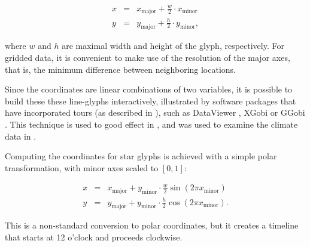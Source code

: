 \documentclass[oneside]{article}
\newcommand\amin{\text{minor}}
\newcommand\amaj{\text{major}}
\begin{document}
\begin{equation}
  \begin{array}{lll}
  x &=& x_{\amaj} + \frac{w}{2} \cdot x_{\amin}\\
  y &=& y_{\amaj} + \frac{h}{2} \cdot y_{\amin}, 
  \end{array}
  \label{coords.eqn}
\end{equation}

\noindent where $w$ and $h$ are maximal width and height of the glyph, respectively. For gridded data, it is convenient to make use of the resolution of the major axes, that is, the minimum difference between neighboring locations. 

Since the coordinates are linear combinations of two variables, it is possible to build these these line-glyphs interactively, illustrated by software packages that have incorporated tours (as described in \citet{cook:2006}), such as DataViewer \citep{buja:1986}, XGobi \citep{swayne:1991} or GGobi \citep{swayne:2003}. This technique is used to good effect in \citet{buja:1996a}, and was used to examine the climate data in \citet{hobbs:2010}.

Computing the coordinates for star glyphs is achieved with a simple polar transformation, with minor axes scaled to $[0, 1]$: 

\begin{equation}
  \begin{array}{lll}
  x &=& x_{\amaj} + y_{\amin} \cdot \frac{w}{2} \sin(2 \pi x_{\amin}) \\
  y &=& y_{\amaj} + y_{\amin} \cdot \frac{h}{2} \cos(2 \pi x_{\amin}).
  \end{array}
  \label{coords.polar.eqn}
\end{equation}

\noindent This is a non-standard conversion to polar coordinates, but it creates a timeline that starts at 12 o'clock and proceeds clockwise.

%
% 
% 
%     
%   
\end{document}
